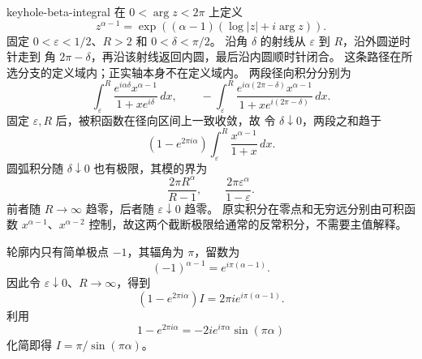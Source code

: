 \begin{solution}{keyhole-beta-integral}
在 \(0<\arg z<2\pi\) 上定义
\[
 z^{\alpha-1}
 =\exp((\alpha-1)(\log|z|+i\arg z)).
\]
固定 \(0<\varepsilon<1/2\)、\(R>2\) 和 \(0<\delta<\pi/2\)。
沿角 \(\delta\) 的射线从 \(\varepsilon\) 到 \(R\)，沿外圆逆时针走到
角 \(2\pi-\delta\)，再沿该射线返回内圆，最后沿内圆顺时针闭合。
这条路径在所选分支的定义域内；正实轴本身不在定义域内。
两段径向积分分别为
\[
 \int_\varepsilon^R\frac{e^{i\alpha\delta}x^{\alpha-1}}{1+xe^{i\delta}}\,dx,
 \qquad
 -\int_\varepsilon^R
 \frac{e^{i\alpha(2\pi-\delta)}x^{\alpha-1}}{1+xe^{i(2\pi-\delta)}}\,dx.
\]
固定 \(\varepsilon,R\) 后，被积函数在径向区间上一致收敛，故
令 \(\delta\downarrow0\)，两段之和趋于
\[
 (1-e^{2\pi i\alpha})
 \int_\varepsilon^R\frac{x^{\alpha-1}}{1+x}\,dx.
\]
圆弧积分随 \(\delta\downarrow0\) 也有极限，其模的界为
\[
 \frac{2\pi R^\alpha}{R-1},\qquad
 \frac{2\pi\varepsilon^\alpha}{1-\varepsilon}.
\]
前者随 \(R\to\infty\) 趋零，后者随 \(\varepsilon\downarrow0\) 趋零。
原实积分在零点和无穷远分别由可积函数 \(x^{\alpha-1}\)、\(x^{\alpha-2}\)
控制，故这两个截断极限给通常的反常积分，不需要主值解释。

轮廓内只有简单极点 \(-1\)，其辐角为 \(\pi\)，留数为
\[
 (-1)^{\alpha-1}=e^{i\pi(\alpha-1)}.
\]
因此令 \(\varepsilon\downarrow0\)、\(R\to\infty\)，得到
\[
 (1-e^{2\pi i\alpha})I
 =2\pi i e^{i\pi(\alpha-1)}.
\]
利用
\[
 1-e^{2\pi i\alpha}
 =-2i e^{i\pi\alpha}\sin(\pi\alpha)
\]
化简即得 \(I=\pi/\sin(\pi\alpha)\)。
\end{solution}
